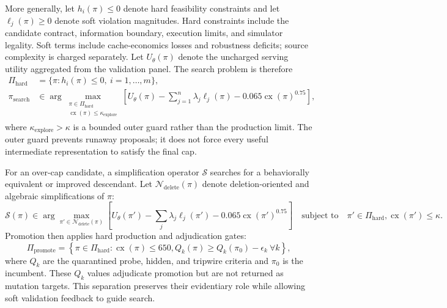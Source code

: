 \documentclass[11pt]{article}
\begin{document}
More generally, let \(h_i(\pi)\le0\) denote hard feasibility constraints and let
\(\ell_j(\pi)\ge0\) denote soft violation magnitudes.  Hard constraints include the
candidate contract, information boundary, execution limits, and simulator legality.
Soft terms include cache-economics losses and robustness deficits; source complexity
is charged separately.  Let \(U_\theta(\pi)\) denote the uncharged serving utility
aggregated from the validation panel.  The search problem is therefore
\begin{align}
  \Pi_{\mathrm{hard}}
    &=\{\pi:h_i(\pi)\le0,\ i=1,\ldots,m\},\\
  \pi_{\mathrm{search}}
    &\in\arg\max_{\substack{\pi\in\Pi_{\mathrm{hard}}\\
                            \operatorname{cx}(\pi)\le\kappa_{\mathrm{explore}}}}
      \left[
        U_\theta(\pi)
        -\sum_{j=1}^{n}\lambda_j\ell_j(\pi)
        -0.065\operatorname{cx}(\pi)^{0.75}
      \right],
  \label{eq:hard-soft-search}
\end{align}
where \(\kappa_{\mathrm{explore}}>\kappa\) is a bounded outer guard rather than the
production limit.  The outer guard prevents runaway proposals; it does not force every
useful intermediate representation to satisfy the final cap.

For an over-cap candidate, a simplification operator \(\mathcal S\) searches for a
behaviorally equivalent or improved descendant.  Let
\(\mathcal N_{\mathrm{delete}}(\pi)\) denote deletion-oriented and algebraic
simplifications of \(\pi\):
\begin{equation}
  \mathcal S(\pi)
  \in\arg\max_{\pi'\in\mathcal N_{\mathrm{delete}}(\pi)}
  \left[
    U_\theta(\pi')-\sum_j\lambda_j\ell_j(\pi')
    -0.065\operatorname{cx}(\pi')^{0.75}
  \right]
  \quad\text{subject to}\quad
  \pi'\in\Pi_{\mathrm{hard}},
  \operatorname{cx}(\pi')\le\kappa.
  \label{eq:simplification-operator}
\end{equation}
Promotion then applies hard production and adjudication gates:
\begin{equation}
  \Pi_{\mathrm{promote}}=
  \left\{\pi\in\Pi_{\mathrm{hard}}:
    \operatorname{cx}(\pi)\le650,
    Q_k(\pi)\ge Q_k(\pi_0)-\epsilon_k\ \forall k
  \right\},
  \label{eq:promotion-class}
\end{equation}
where \(Q_k\) are the quarantined probe, hidden, and tripwire criteria and \(\pi_0\) is
the incumbent.  These \(Q_k\) values adjudicate promotion but are not returned as
mutation targets.  This separation preserves their evidentiary role while allowing
soft validation feedback to guide search.
\end{document}
